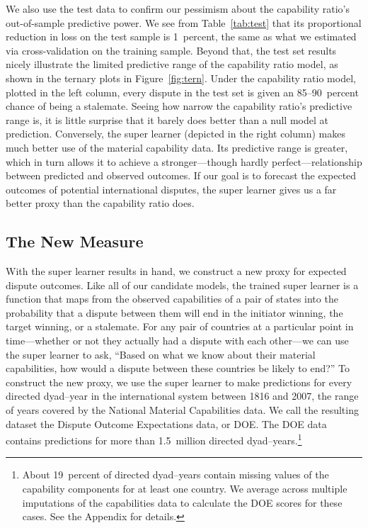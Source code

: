 We also use the test data to confirm our pessimism about the capability ratio's out-of-sample predictive power.
We see from Table~\ref{tab:test} that its proportional reduction in loss on the test sample is 1~percent, the same as what we estimated via cross-validation on the training sample.
Beyond that, the test set results nicely illustrate the limited predictive range of the capability ratio model, as shown in the ternary plots in Figure~\ref{fig:tern}.
Under the capability ratio model, plotted in the left column, every dispute in the test set is given an 85--90~percent chance of being a stalemate.
Seeing how narrow the capability ratio's predictive range is, it is little surprise that it barely does better than a null model at prediction.
Conversely, the super learner (depicted in the right column) makes much better use of the material capability data.
Its predictive range is greater, which in turn allows it to achieve a stronger---though hardly perfect---relationship between predicted and observed outcomes.
If our goal is to forecast the expected outcomes of potential international disputes, the super learner gives us a far better proxy than the capability ratio does.

\subsection{The New Measure}

With the super learner results in hand, we construct a new proxy for expected dispute outcomes.
Like all of our candidate models, the trained super learner is a function that maps from the observed capabilities of a pair of states into the probability that a dispute between them will end in the initiator winning, the target winning, or a stalemate.
For any pair of countries at a particular point in time---whether or not they actually had a dispute with each other---we can use the super learner to ask, ``Based on what we know about their material capabilities, how would a dispute between these countries be likely to end?''
To construct the new proxy, we use the super learner to make predictions for every directed dyad--year in the international system between 1816 and 2007, the range of years covered by the National Material Capabilities data.
We call the resulting dataset the Dispute Outcome Expectations data, or DOE.
The DOE data contains predictions for more than 1.5~million directed dyad--years.\footnote{
  About 19~percent of directed dyad--years contain missing values of the capability components for at least one country.
  We average across multiple imputations of the capabilities data to calculate the DOE scores for these cases.
  See the Appendix for details.
}

